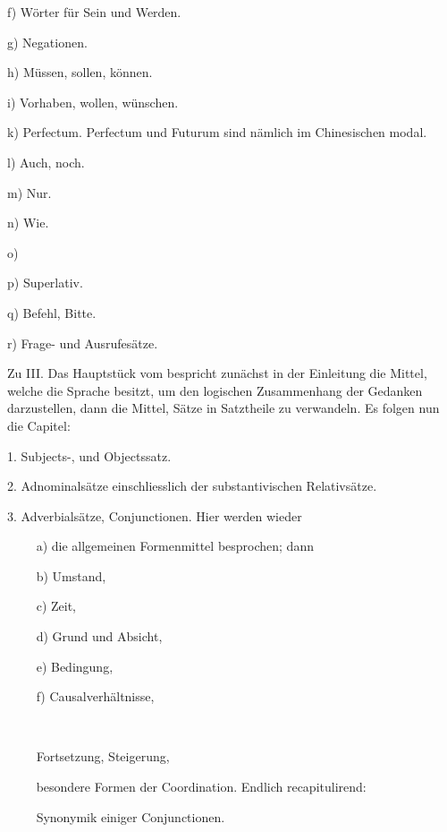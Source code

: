 f) Wörter für Sein und Werden.

g) Negationen.

h) Müssen, sollen, können.

i) Vorhaben, wollen, wünschen.

k) Perfectum. Perfectum und Futurum sind nämlich im Chinesischen modal.

l) Auch, noch.

m) Nur.

\label{fp.108}

n) Wie.

o) 

p) Superlativ.

q) Befehl, Bitte.

r) Frage- und Ausrufesätze.

Zu III. Das Hauptstück vom  bespricht zunächst in der Einleitung die Mittel, welche \label{sp.104} die Sprache besitzt, um den logischen Zusammenhang der Gedanken darzustellen, dann die Mittel, Sätze in Satztheile zu verwandeln. Es folgen nun die Capitel:

1. Subjects-,  und Objectssatz.

2. Adnominalsätze einschliesslich der substantivischen Relativsätze.

3. Adverbialsätze, Conjunctionen. Hier werden wieder

~~~~ a) die allgemeinen Formenmittel besprochen; dann

~~~~ b) Umstand,

~~~~ c) Zeit,

~~~~ d) Grund und Absicht,

~~~~ e) Bedingung,

~~~~ f) Causalverhältnisse,

~~~~ 

~~~~  Fortsetzung, Steigerung,

\largerpage[1]~~~~  besondere Formen der Coordination. Endlich recapitulirend:

~~~~  Synonymik einiger Conjunctionen.

